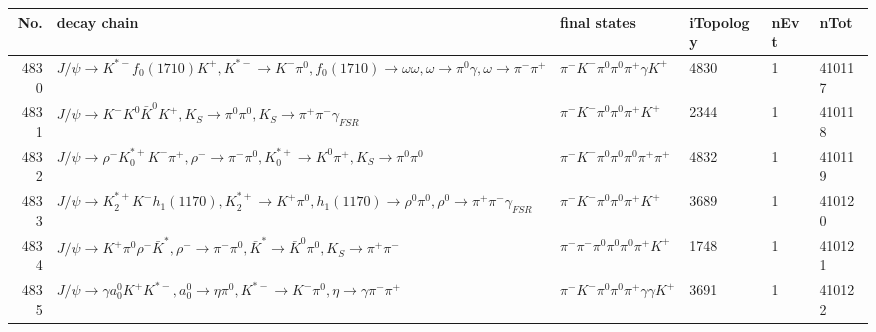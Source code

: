 \begin{table}[htbp] 
\begin{center}
\begin{small}
\begin{tabular}{rlllll}\hline\hline
 No. & decay chain & final states &  iTopology & nEvt & nTot \\\hline
4830&$J/\psi       \rightarrow K^{*-}         f_{0}(1710)    K^{+}          , K^{*-}          \rightarrow K^{-}          \pi^{0}        , f_{0}(1710)     \rightarrow \omega         \omega         , \omega          \rightarrow \pi^{0}        \gamma       , \omega          \rightarrow \pi^{-}        \pi^{+}        $&$\pi^{-}        K^{-}          \pi^{0}        \pi^{0}        \pi^{+}        \gamma       K^{+}          $& 4830&    1&410117\\
4831&$J/\psi       \rightarrow K^{-}          K^{0}          \bar{K}^{0}   K^{+}          , K_{S}           \rightarrow \pi^{0}        \pi^{0}        , K_{S}           \rightarrow \pi^{+}        \pi^{-}        \gamma_{FSR} $&$\pi^{-}        K^{-}          \pi^{0}        \pi^{0}        \pi^{+}        K^{+}          $& 2344&    1&410118\\
4832&$J/\psi       \rightarrow \rho^{-}      K_{0}^{*+}     K^{-}          \pi^{+}        , \rho^{-}       \rightarrow \pi^{-}        \pi^{0}        , K_{0}^{*+}      \rightarrow K^{0}          \pi^{+}        , K_{S}           \rightarrow \pi^{0}        \pi^{0}        $&$\pi^{-}        K^{-}          \pi^{0}        \pi^{0}        \pi^{0}        \pi^{+}        \pi^{+}        $& 4832&    1&410119\\
4833&$J/\psi       \rightarrow K_2^{*+}       K^{-}          h_{1}(1170)    , K_2^{*+}        \rightarrow K^{+}          \pi^{0}        , h_{1}(1170)     \rightarrow \rho^{0}      \pi^{0}        , \rho^{0}       \rightarrow \pi^{+}        \pi^{-}        \gamma_{FSR} $&$\pi^{-}        K^{-}          \pi^{0}        \pi^{0}        \pi^{+}        K^{+}          $& 3689&    1&410120\\
4834&$J/\psi       \rightarrow K^{+}          \pi^{0}        \rho^{-}      \bar{K}^{*}   , \rho^{-}       \rightarrow \pi^{-}        \pi^{0}        , \bar{K}^{*}    \rightarrow \bar{K}^{0}   \pi^{0}        , K_{S}           \rightarrow \pi^{+}        \pi^{-}        $&$\pi^{-}        \pi^{-}        \pi^{0}        \pi^{0}        \pi^{0}        \pi^{+}        K^{+}          $& 1748&    1&410121\\
4835&$J/\psi       \rightarrow \gamma       a_{0}^{0}      K^{+}          K^{*-}         , a_{0}^{0}       \rightarrow \eta          \pi^{0}        , K^{*-}          \rightarrow K^{-}          \pi^{0}        , \eta           \rightarrow \gamma       \pi^{-}        \pi^{+}        $&$\pi^{-}        K^{-}          \pi^{0}        \pi^{0}        \pi^{+}        \gamma       \gamma       K^{+}          $& 3691&    1&410122\\

\end{tabular}
\end{small}
\end{center}
\end{table}
